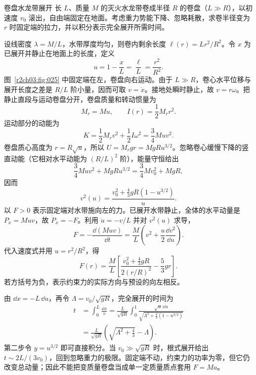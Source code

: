 \begin{practicebox}{卷盘水龙带展开}
长 $L$、质量 $M$ 的灭火水龙带卷成半径 $R$ 的卷盘（$L\gg R$），以初速度 $v_0$ 滚出，自由端固定在地面。考虑重力势能下降、忽略耗散，求卷半径变为 $r$ 时固定端的拉力，并以积分表示完全展开所需时间。
\label{r2ch03:pr:009}
\begin{solution}
设线密度 $\lambda=M/L$，水带厚度均匀，则卷内剩余长度
$\ell(r)=Lr^2/R^2$。令 $x$ 为已展开并静止在地面上的长度，定义
\[
 u=1-\frac{x}{L}=\frac{\ell}{L}=\frac{r^2}{R^2}.
\]
图~\ref{r2ch03:fig:025} 中固定端在左，卷盘向右运动。由于 $L\gg R$，卷心水平位移与展开长度之差是 $R/L$ 阶小量，因而可取 $v=\dot x$。接地处瞬时静止，故 $v=r\omega$。把静止直段与运动卷盘分开，卷盘质量和转动惯量为
\[
 M_r=Mu,\qquad I(r)=\frac12M_r r^2.
\]
运动部分的动能为
\[
 K=\frac12M_rv^2+\frac12I\omega^2=\frac34Muv^2.
\]
卷盘质心高度为 $r=R\sqrt u$，所以 $U=M_rgr=MgR u^{3/2}$。忽略卷心缓慢下降的竖直动能（它相对水平动能为 $(R/L)^2$ 阶），能量守恒给出
\[
 \frac34Muv^2+MgR u^{3/2}=\frac34Mv_0^2+MgR,
\]
因而
\[
 \boxed{v^2(u)=\frac{v_0^2+\frac43gR(1-u^{3/2})}{u}}.
\]
以 $F>0$ 表示固定端对水带施向左的力。已展开水带静止，全体的水平动量是 $P_x=Muv$，故 $\dot P_x=-F$。利用 $\dot u=-v/L$ 并对 $v^2(u)$ 求导，
\[
 F=-\frac{\dd(Muv)}{\dd t}
 =\frac ML\left(v^2+\frac u2\frac{\dd v^2}{\dd u}\right).
\]
代入速度式并用 $u=r^2/R^2$，得
\[
 \boxed{F(r)=\frac{M}{L}\left[
 \frac{v_0^2+\frac43gR}{2(r/R)^2}-\frac53gr
 \right]}.
\]
若方括号为负，表示约束力的实际方向与预设的向左相反。

由 $\dd x=-L\,\dd u$，再令 $\Lambda=v_0/\sqrt{gR}$，完全展开的时间为
\begin{align*}
 t&=\int_0^L\frac{\dd x}{v}
 =\frac{L}{\sqrt{gR}}\int_0^1
 \frac{\sqrt u\,\dd u}{\sqrt{\Lambda^2+\frac43(1-u^{3/2})}}\\
 &=\boxed{\frac{L}{\sqrt{gR}}
 \left(\sqrt{\Lambda^2+\frac43}-\Lambda\right)}.
\end{align*}
第二步令 $y=u^{3/2}$ 即可直接积分。当 $v_0\gg\sqrt{gR}$ 时，根式展开给出 $t\sim2L/(3v_0)$，回到忽略重力的极限。固定端不动，约束力的功率为零，但它仍改变总动量；因此不能把变质量卷盘当成单一定质量质点套用 $F=Ma$。
\figHoseUnroll
\end{solution}
\end{practicebox}

